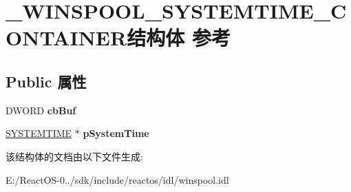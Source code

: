 \hypertarget{struct___w_i_n_s_p_o_o_l___s_y_s_t_e_m_t_i_m_e___c_o_n_t_a_i_n_e_r}{}\section{\+\_\+\+W\+I\+N\+S\+P\+O\+O\+L\+\_\+\+S\+Y\+S\+T\+E\+M\+T\+I\+M\+E\+\_\+\+C\+O\+N\+T\+A\+I\+N\+E\+R结构体 参考}
\label{struct___w_i_n_s_p_o_o_l___s_y_s_t_e_m_t_i_m_e___c_o_n_t_a_i_n_e_r}
\subsection*{Public 属性}
\begin{DoxyCompactItemize}
\item 
\mbox{\label{struct___w_i_n_s_p_o_o_l___s_y_s_t_e_m_t_i_m_e___c_o_n_t_a_i_n_e_r_aa0f6cd23fd9a340d1cdef14e2c901c98}} 
D\+W\+O\+RD {\bfseries cb\+Buf}
\item 
\mbox{\label{struct___w_i_n_s_p_o_o_l___s_y_s_t_e_m_t_i_m_e___c_o_n_t_a_i_n_e_r_a093a5a8486ad828e288a12fa117f4775}} 
\hyperlink{struct___s_y_s_t_e_m_t_i_m_e}{S\+Y\+S\+T\+E\+M\+T\+I\+ME} $\ast$ {\bfseries p\+System\+Time}
\end{DoxyCompactItemize}


该结构体的文档由以下文件生成\+:\begin{DoxyCompactItemize}
\item 
E\+:/\+React\+O\+S-\/0../sdk/include/reactos/idl/winspool.\+idl\end{DoxyCompactItemize}
